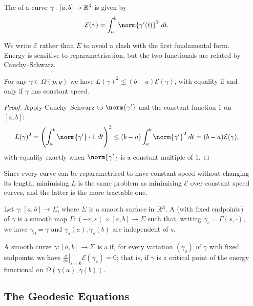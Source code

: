 \documentclass[a4paper]{scrartcl}
\begin{document}
\begin{definition}[Energy]
    The  of a curve $\gamma: [a,b] \rightarrow \mathbb{R}^3$ is given by
    $$\mathcal{E}(\gamma) = \int_a^b \norm{\gamma'(t)}^2 \dd t.$$
\end{definition}

We write $\mathcal E$ rather than $E$ to avoid a clash with the first fundamental form. Energy is sensitive to reparametrisation, but the two functionals are related by Cauchy--Schwarz.

\begin{lemma}
    For any $\gamma \in \Omega(p,q)$ we have $L(\gamma)^2 \leq (b-a)\mathcal{E}(\gamma)$, with equality if and only if $\gamma$ has constant speed.
\end{lemma}
\begin{proof}
    Apply Cauchy--Schwarz to $\norm{\gamma'}$ and the constant function $1$ on $[a,b]$:
    $$
    L(\gamma)^2 = \left(\int_a^b \norm{\gamma'}\cdot 1 \dd t\right)^2 \leq (b-a)\int_a^b \norm{\gamma'}^2\dd t = (b-a)\mathcal{E}(\gamma),
    $$
    with equality exactly when $\norm{\gamma'}$ is a constant multiple of $1$.
\end{proof}

Since every curve can be reparametrised to have constant speed without changing its length, minimising $L$ is the same problem as minimising $\mathcal E$ over constant speed curves, and the latter is the more tractable one.

\begin{definition}
    Let $\gamma: [a, b] \rightarrow \Sigma$, where $\Sigma$ is a smooth surface in $\mathbb{R}^3$. A  (with fixed endpoints) of $\gamma$ is a smooth map $\Gamma: (-\varepsilon, \varepsilon) \times [a, b] \rightarrow \Sigma$ such that, writing $\gamma_s = \Gamma(s, \cdot)$, we have $\gamma_0 = \gamma$ and $\gamma_s(a), \gamma_s(b)$ are independent of $s$.
\end{definition}

\begin{definition}[Geodesic]
    A smooth curve $\gamma: [a, b] \rightarrow \Sigma$ is a  if, for every variation $(\gamma_s)$ of $\gamma$ with fixed endpoints, we have $\left.\frac{\dd}{\dd s}\right|_{s = 0} \mathcal{E}(\gamma_s) = 0$; that is, if $\gamma$ is a critical point of the energy functional on $\Omega(\gamma(a), \gamma(b))$.
\end{definition}

\subsection{The Geodesic Equations}
\end{document}

